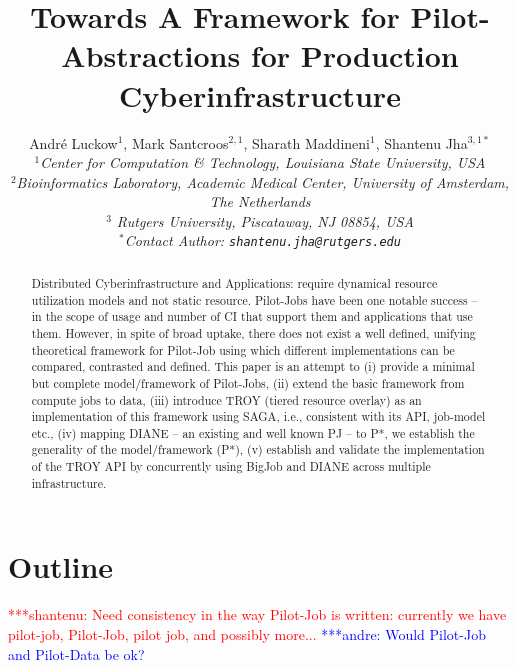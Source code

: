\documentclass[conference,final]{IEEEtran}
\title{Towards A Framework for Pilot-Abstractions for Production
  Cyberinfrastructure}
\date{}
\newcommand{\jhanote}[1]{ {\textcolor{red} { ***shantenu: #1 }}}
\newcommand{\alnote}[1]{ {\textcolor{blue} { ***andre: #1 }}}
\newcommand{\alnote}[1]{}
\newcommand{\jhanote}[1]{}
\newcommand{\up}{\vspace*{-1em}}
\begin{document}
\ifpdf
{}
\else
{}
\fi

\author{
  Andr\'e Luckow$^{1}$, Mark Santcroos$^{2,1}$, Sharath Maddineni$^{1}$, Shantenu Jha$^{3,1*}$\\
  \small{\emph{$^{1}$Center for Computation \& Technology, Louisiana State University, USA}}\\
 \small{\emph{$^{2}$Bioinformatics Laboratory, Academic Medical Center, University of Amsterdam, The Netherlands}}\\
 \small{\emph{$^{3}$ Rutgers University, Piscataway, NJ 08854, USA}}\\
  \small{\emph{$^{*}$Contact Author: \texttt{shantenu.jha@rutgers.edu}}}\\
  \up\up\up\up }

\maketitle

\begin{abstract}
  Distributed Cyberinfrastructure and Applications: require dynamical
  resource utilization models and not static resource.  Pilot-Jobs
  have been one notable success -- in the scope of usage and number of
  CI that support them and applications that use them.  However, in
  spite of broad uptake, there does not exist a well defined, unifying
  theoretical framework for Pilot-Job using which different
  implementations can be compared, contrasted and defined. This paper
  is an attempt to (i) provide a minimal but complete model/framework
  of Pilot-Jobs, (ii) extend the basic framework from compute jobs to
  data, (iii) introduce TROY (tiered resource overlay) as an
  implementation of this framework using SAGA, i.e., consistent with
  its API, job-model etc., (iv) mapping DIANE -- an existing and well
  known PJ -- to P*, we establish the generality of the
  model/framework (P*), (v) establish and validate the implementation
  of the TROY API by concurrently using BigJob and DIANE across
  multiple infrastructure.
\end{abstract}

\section*{Outline}

\jhanote{Need consistency in the way Pilot-Job is written: currently
  we have pilot-job, Pilot-Job, pilot job, and possibly more...} \alnote{Would 
Pilot-Job and Pilot-Data be ok?}
\end{document}
